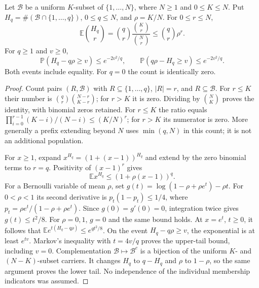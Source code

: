 \begin{proposition}
\label{prop:Mazur-cut-count}
Let $\mathcal B$ be a uniform $K$-subset of $\{1,\ldots,N\}$,
where $N\ge1$ and $0\le K\le N$. Put
$H_q=\#(\mathcal B\cap\{1,\ldots,q\})$, $0\le q\le N$,
and $\rho=K/N$. For $0\le r\le N$,
\begin{equation}
 \mathbb E\binom{H_q}{r}
   =\binom qr\frac{\binom Kr}{\binom Nr}
   \le\binom qr\rho^r.
 \label{eq:Mazur-cut-moments}
\end{equation}
For $q\ge1$ and $v\ge0$,
\begin{equation}
 \mathbb P(H_q-q\rho\ge v)\le e^{-2v^2/q},\qquad
 \mathbb P(q\rho-H_q\ge v)\le e^{-2v^2/q}.
 \label{eq:Mazur-cut-tails}
\end{equation}
Both events include equality. For $q=0$ the count is identically zero.
\end{proposition}
\begin{proof}
Count pairs $(R,\mathcal B)$ with $R\subseteq\{1,\ldots,q\}$,
$|R|=r$, and $R\subseteq\mathcal B$. For $r\le K$ their number is
$\binom qr\binom{N-r}{K-r}$; for $r>K$ it is zero.
Dividing by $\binom NK$ proves the identity, with binomial zeros retained.
For $r\le K$ the ratio equals
$\prod_{i=0}^{r-1}(K-i)/(N-i)\le(K/N)^r$;
for $r>K$ its numerator is zero.
More generally a prefix extending beyond $N$ uses $\min(q,N)$
in this count; it is not an additional population.

For $x\ge1$, expand $x^{H_q}=(1+(x-1))^{H_q}$ and extend by
the zero binomial terms to $r=q$. Positivity of $(x-1)^r$ gives
\[
 \mathbb E x^{H_q}\le(1+\rho(x-1))^q.
\]
For a Bernoulli variable of mean $\rho$, set
$g(t)=\log(1-\rho+\rho e^t)-\rho t$.
For $0<\rho<1$ its second derivative is $p_t(1-p_t)\le1/4$,
where $p_t=\rho e^t/(1-\rho+\rho e^t)$.
Since $g(0)=g'(0)=0$, integration twice gives $g(t)\le t^2/8$.
For $\rho=0,1$, $g=0$ and the same bound holds.
At $x=e^t$, $t\ge0$, it follows that
$\mathbb E e^{t(H_q-q\rho)}\le e^{qt^2/8}$.
On the event $H_q-q\rho\ge v$, the exponential is at least $e^{tv}$.
Markov's inequality with $t=4v/q$ proves the upper-tail bound,
including $v=0$. Complementation $\mathcal B\mapsto\mathcal B^c$
is a bijection of the uniform $K$- and $(N-K)$-subset carriers.
It changes $H_q$ to $q-H_q$ and $\rho$ to $1-\rho$,
so the same argument proves the lower tail. No independence of
the individual membership indicators was assumed.
\end{proof}

